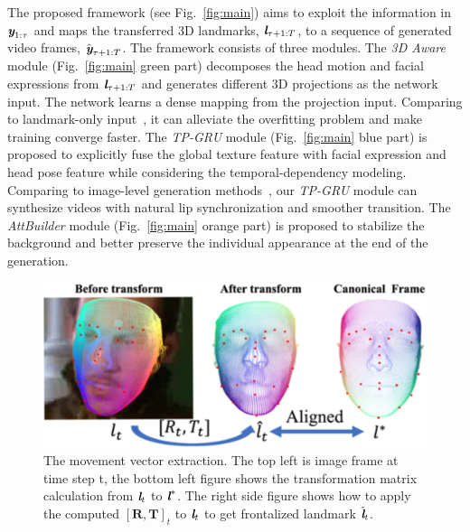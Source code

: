 \documentclass[runningheads]{llncs}
\def\mathbi#1{\textbf{\em #1}}
\providecommand{\CXu}[1]{\textcolor{red}{[{\bf #1}]}}
\begin{document}
The proposed framework (see Fig.~\ref{fig:main}) aims to exploit the information in $\mathbi{y}_{1:\tau}$ and maps the transferred 3D landmarks, $\mathbi{l}_{\tau+1:T}$, to a sequence of generated video frames, $\hat{\mathbi{y}}_{ \tau+1:T}$. The framework consists of three modules. The \textit{3D Aware} module (Fig.~\ref{fig:main} green part) decomposes the head motion and facial expressions from $\mathbi{l}_{\tau+1:T}$ and generates different 3D projections as the network input. The network learns a dense mapping from the projection input. Comparing to landmark-only input~\cite{zakharov2019few,wang2018fewshotvid2vid,wang2018high}, it can alleviate the overfitting problem and make training converge faster. The \textit{TP-GRU} module (Fig.~\ref{fig:main} blue part) is proposed to explicitly fuse the global texture feature with facial expression and head pose feature while considering the temporal-dependency modeling. Comparing to image-level generation methods~\cite{chung2017you,pumarola2019ganimation,zhou2019talking,zakharov2019few,wang2018high}, our \textit{TP-GRU} module can synthesize videos with natural lip synchronization and smoother transition. The \textit{AttBuilder} module (Fig.~\ref{fig:main} orange part) is proposed to stabilize the background and better preserve the individual appearance at the end of the generation. 



\begin{figure}
\includegraphics[width=0.8 \linewidth]{latex/images/RT_reduce.pdf}
\caption{The movement vector extraction. The top left is image frame at time step t, the bottom left figure shows the transformation matrix calculation from $\mathbi{l}_t$ to $\mathbi{l}^*$. The right side figure shows how to apply the computed $[\mathbf{R},\mathbf{T}]_t$ to $\mathbi{l}_t$ to get frontalized landmark $\hat{\mathbi{l}}_t$.}
\label{fig:rt_compute}
\end{figure}
\end{document}
